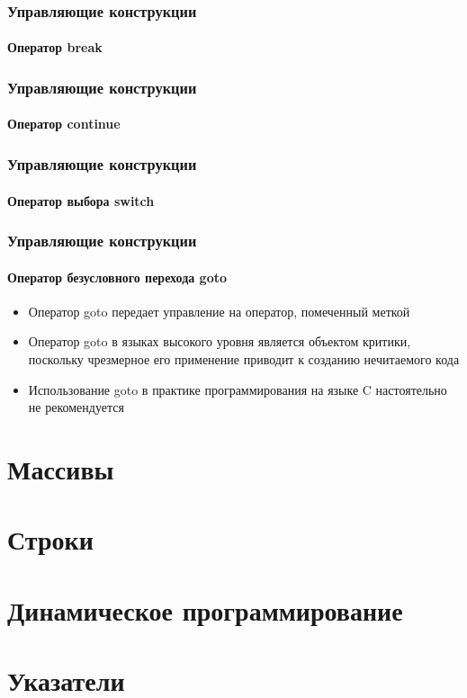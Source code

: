 \documentclass[12pt,pdf,hyperref={unicode}]{beamer}
\begin{document}
\begin{frame}
\frametitle{Управляющие конструкции} 
\framesubtitle{Оператор break}


\end{frame}

\begin{frame}
\frametitle{Управляющие конструкции} 
\framesubtitle{Оператор continue}


\end{frame}

\begin{frame}
\frametitle{Управляющие конструкции} 
\framesubtitle{Оператор выбора switch}


\end{frame}


\begin{frame}
\frametitle{Управляющие конструкции} 
\framesubtitle{Оператор безусловного перехода goto}

\begin{itemize}
\item Оператор goto передает управление на оператор, помеченный меткой
\item Оператор goto в языках высокого уровня является объектом критики, поскольку чрезмерное его применение приводит к созданию нечитаемого кода
\item Использование goto в практике программирования на языке C настоятельно не рекомендуется
\end{itemize}


\end{frame}


\section{Массивы}


\section{Строки}

\section{Динамическое программирование}


\section{Указатели}
\end{document}
